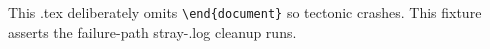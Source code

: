 \documentclass[letterpaper,11pt]{article}
\begin{document}
This .tex deliberately omits \texttt{\textbackslash end\{document\}} so tectonic crashes.
This fixture asserts the failure-path stray-.log cleanup runs.
\end{document}
